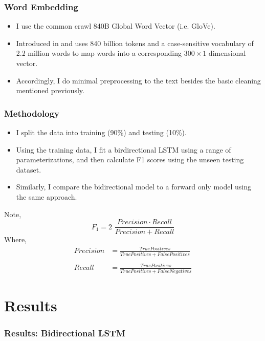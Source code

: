 \documentclass{beamer}
\begin{document}
    \begin{frame}
    	\frametitle{Word Embedding}
    	\begin{itemize}
    		\item I use the common crawl 840B Global Word Vector (i.e. GloVe).
    		\item Introduced in \citet{pennington2014glove} and uses 840 billion tokens and a case-sensitive vocabulary of 2.2 million words to map words into a corresponding $300 \times 1$ dimensional vector. 
    		\item Accordingly, I do minimal preprocessing to the text besides the basic cleaning mentioned previously. 
    	\end{itemize}
    \end{frame}

    \begin{frame}
    	\frametitle{Methodology}
    	\begin{itemize}
    		\item I split the data into training (90\%) and testing (10\%). 
    		\item Using the training data, I fit a birdirectional LSTM using a range of parameterizations, and then calculate F1 scores using the unseen testing dataset. 
    		\item Similarly, I compare the bidirectional model to a forward only model using the same approach. 
    	\end{itemize}
        Note, 
        \begin{equation*}
        F_1 =  2 \,\, \frac{Precision \cdot Recall}{Precision + Recall}
        \end{equation*}
        Where, 
        \begin{align*}
        Precision &= \frac{True Positives}{True Positives + False Positives}\\ \\
        Recall &= \frac{True Positives}{True Positives + False Negatives}
        \end{align*}
    \end{frame}


\section{Results}

    \begin{frame}
    	\frametitle{Results: Bidirectional LSTM}
    	
    \end{frame}
\end{document}
